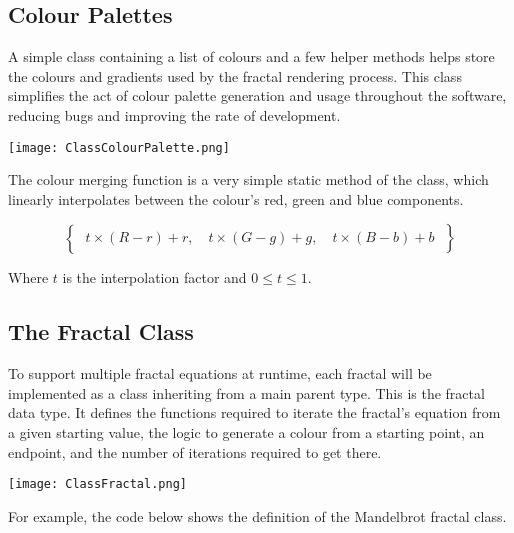 \subsection{Colour Palettes}

A simple class containing a list of colours and a few helper methods helps store the colours and gradients used by the fractal rendering process. This class simplifies the act of colour palette generation and usage throughout the software, reducing bugs and improving the rate of development.

\FloatBarrier
\begin{figure*}[htp]
	\centering
	\texttt{[image: ClassColourPalette.png]}
\end{figure*}
\FloatBarrier

The colour merging function is a very simple static method of the class, which linearly interpolates between the colour's red, green and blue components.

\begin{equation}
	\left\{ \phantom{\frac{a}{b}} t \times (R-r) + r, \quad t \times (G-g) + g, \quad t \times (B-b) + b \phantom{\frac{a}{b}} \right\}
\end{equation}

Where $t$ is the interpolation factor and $0 \le t \le 1$.

\subsection{The Fractal Class}

To support multiple fractal equations at runtime, each fractal will be implemented as a class inheriting from a main parent type. This is the fractal data type. It defines the functions required to iterate the fractal's equation from a given starting value, the logic to generate a colour from a starting point, an endpoint, and the number of iterations required to get there.

\FloatBarrier
\begin{figure*}[htp]
	\centering
	\texttt{[image: ClassFractal.png]}
\end{figure*}
\FloatBarrier

\vspace{0.5cm}
\noindent
For example, the code below shows the definition of the Mandelbrot fractal class.

